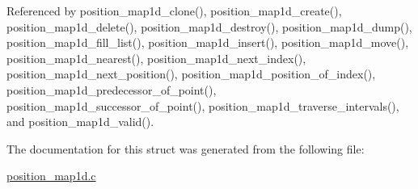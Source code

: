 Referenced by position\+\_\+map1d\+\_\+clone(), position\+\_\+map1d\+\_\+create(), position\+\_\+map1d\+\_\+delete(), position\+\_\+map1d\+\_\+destroy(), position\+\_\+map1d\+\_\+dump(), position\+\_\+map1d\+\_\+fill\+\_\+list(), position\+\_\+map1d\+\_\+insert(), position\+\_\+map1d\+\_\+move(), position\+\_\+map1d\+\_\+nearest(), position\+\_\+map1d\+\_\+next\+\_\+index(), position\+\_\+map1d\+\_\+next\+\_\+position(), position\+\_\+map1d\+\_\+position\+\_\+of\+\_\+index(), position\+\_\+map1d\+\_\+predecessor\+\_\+of\+\_\+point(), position\+\_\+map1d\+\_\+successor\+\_\+of\+\_\+point(), position\+\_\+map1d\+\_\+traverse\+\_\+intervals(), and position\+\_\+map1d\+\_\+valid().



The documentation for this struct was generated from the following file\+:\begin{DoxyCompactItemize}
\item 
\hyperlink{position__map1d_8c}{position\+\_\+map1d.\+c}\end{DoxyCompactItemize}
